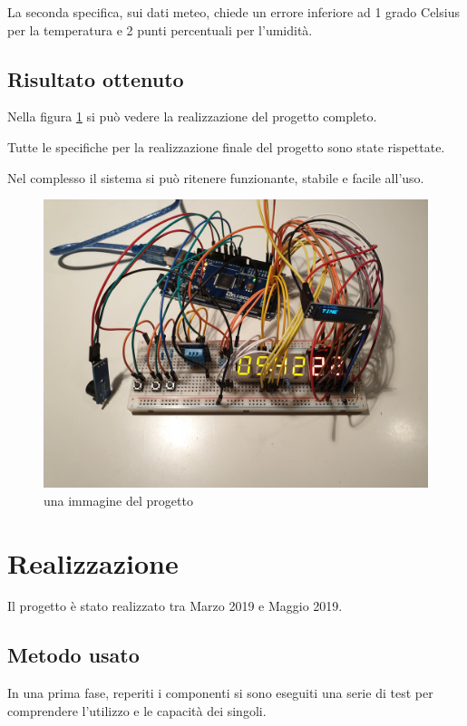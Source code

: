 \documentclass[paper=a4, fontsize=10pt]{scrartcl}
\begin{document}
La seconda specifica, sui dati meteo, chiede un errore inferiore ad 1 grado Celsius per la temperatura e 2 punti percentuali per l'umidità.

\subsection{Risultato ottenuto}
Nella figura \ref{fig:progettoFoto} si può vedere la realizzazione del progetto completo.

Tutte le specifiche per la realizzazione finale del progetto sono state rispettate.

Nel complesso il sistema si può ritenere funzionante, stabile e facile all'uso.

\begin{figure}
  \includegraphics[scale=0.05]{projectPhoto.jpg}
  \caption{una immagine del progetto}
  \label{fig:progettoFoto}
\end{figure}
    

\section{Realizzazione}
Il progetto è stato realizzato tra Marzo 2019 e Maggio 2019.\\

\subsection{Metodo usato}
In una prima fase, reperiti i componenti si sono eseguiti una serie di test per comprendere l'utilizzo e le capacità dei singoli.
\end{document}

